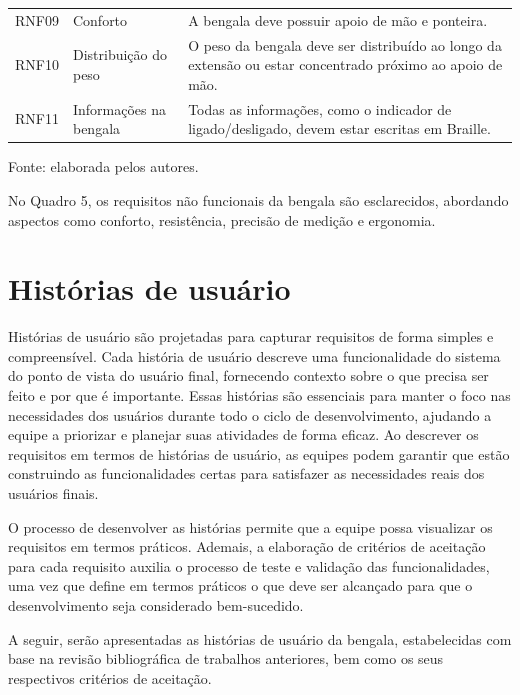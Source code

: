 \begin{quadro}[!ht]
\begin{tabular}{p{}p{}p{}}
        RNF09 & Conforto  &  A bengala deve possuir apoio de mão e ponteira.  \\
        RNF10 & Distribuição do peso &  O peso da bengala deve ser distribuído ao longo da extensão ou estar concentrado próximo ao apoio de mão.  \\
        RNF11 & Informações na bengala &  Todas as informações, como o indicador de ligado/desligado, devem estar escritas em Braille.  \\
        \bottomrule
    \end{tabular}
    \caption*{Fonte: elaborada pelos autores.} %
\end{quadro}

No Quadro 5, os requisitos não funcionais da bengala são esclarecidos, abordando aspectos como conforto, resistência, precisão de medição e ergonomia.

\section{Histórias de usuário}

    Histórias de usuário são projetadas para capturar requisitos de forma simples e compreensível. Cada história de usuário descreve uma funcionalidade do sistema do ponto de vista do usuário final, fornecendo contexto sobre o que precisa ser feito e por que é importante. Essas histórias são essenciais para manter o foco nas necessidades dos usuários durante todo o ciclo de desenvolvimento, ajudando a equipe a priorizar e planejar suas atividades de forma eficaz. Ao descrever os requisitos em termos de histórias de usuário, as equipes podem garantir que estão construindo as funcionalidades certas para satisfazer as necessidades reais dos usuários finais.
    
    O processo de desenvolver as histórias permite que a equipe possa visualizar os requisitos em termos práticos. Ademais, a elaboração de critérios de aceitação para cada requisito auxilia o processo de teste e validação das funcionalidades, uma vez que define em termos práticos o que deve ser alcançado para que o desenvolvimento seja considerado bem-sucedido.

    A seguir, serão apresentadas as histórias de usuário da bengala, estabelecidas com base na revisão bibliográfica de trabalhos anteriores, bem como os seus respectivos critérios de aceitação.

